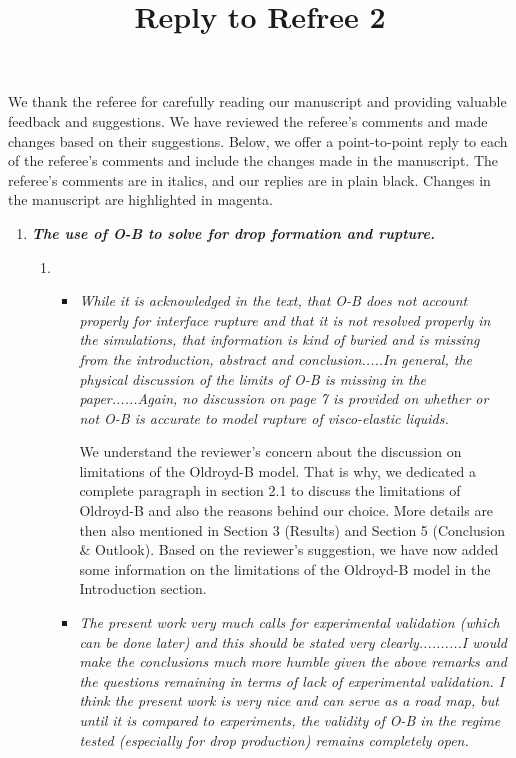 \documentclass[]{article}
\title{\textbf{Reply to Refree 2}}
\date{\vspace{-5ex}}
\newcommand{\vsy}[1]{\todo[color=orange, bordercolor=none, textcolor=white]{Vatsal}\textcolor{orange}{#1}}
\begin{document}
\maketitle %

We thank the referee for carefully reading our manuscript and providing valuable feedback and suggestions. We have reviewed the referee’s comments and made changes based on their suggestions. Below, we offer a point-to-point reply to each of the referee’s comments and include the changes made in the manuscript. The referee’s comments are in italics, and our replies are in plain black. Changes in the manuscript are highlighted in magenta.

\begin{enumerate}
    \item \textbf{\textit{The use of O-B to solve for drop formation and rupture.}}
 \begin{enumerate}
    \item
     \begin{itemize}
        \item  \textit{While it is acknowledged in the text, that O-B does not account properly for interface rupture and that it is not resolved properly in the simulations, that information is kind of buried and is missing from the introduction, abstract and conclusion.....In general, the physical discussion of the limits of O-B is missing in the paper......Again, no discussion on page 7 is provided on whether or not O-B is accurate to model rupture of visco-elastic liquids.}

        We understand the reviewer's concern about the discussion on limitations of the Oldroyd-B model.
        That is why, we dedicated a complete paragraph in section 2.1 to discuss the limitations of Oldroyd-B and also the reasons behind our choice. More details are then also mentioned in Section 3 (Results) and Section 5 (Conclusion \& Outlook). Based on the reviewer's suggestion, we have now added some information on the limitations of the Oldroyd-B model in the Introduction section.


        \item \textit{The present work very much calls for experimental validation (which can be done later) and this should be stated very clearly..........I would make the conclusions much more humble given the above remarks and the questions remaining in terms of lack of experimental validation. I think the present work is very nice and can serve as a road map, but until it is compared to experiments, the validity of O-B in the regime tested (especially for drop production) remains completely open. }


\end{itemize}
\end{enumerate}
\end{enumerate}
\end{document}
